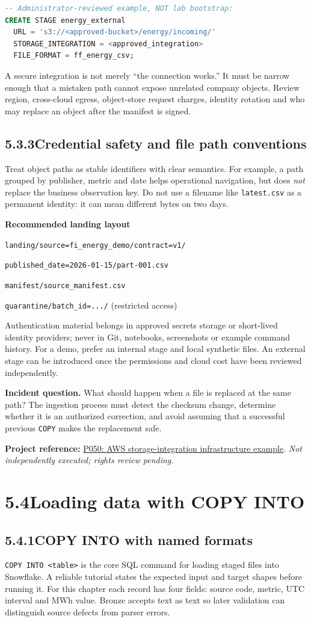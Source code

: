 \documentclass[11pt,twoside]{article}
\newcommand{\topic}[2]{\subsection*{#1\quad #2}}
\newcommand{\repo}[2]{\par\begingroup\fontsize{8.0}{9.6}\selectfont\sffamily\color{inkgray}\textbf{Project reference:} \href{#2}{#1}. \textit{Not independently executed; rights review pending.}\par\endgroup}
\begin{document}
\begin{lstlisting}[language=SQL,caption={External-stage shape; placeholders are not runnable credentials.}]
-- Administrator-reviewed example, NOT lab bootstrap:
CREATE STAGE energy_external
  URL = 's3://<approved-bucket>/energy/incoming/'
  STORAGE_INTEGRATION = <approved_integration>
  FILE_FORMAT = ff_energy_csv;
\end{lstlisting}
A secure integration is not merely ``the connection works.'' It must be narrow enough that a mistaken path cannot expose unrelated company objects. Review region, cross-cloud egress, object-store request charges, identity rotation and who may replace an object after the manifest is signed.

\topic{5.3.3}{Credential safety and file path conventions}
Treat object paths as stable identifiers with clear semantics. For example, a path grouped by publisher, metric and date helps operational navigation, but does \emph{not} replace the business observation key. Do not use a filename like \texttt{latest.csv} as a permanent identity: it can mean different bytes on two days.

\begin{whitebox}\textbf{Recommended landing layout}\par
\texttt{landing/source=fi\_energy\_demo/contract=v1/}\par
\texttt{\quad published\_date=2026-01-15/part-001.csv}\par
\texttt{manifest/source\_manifest.csv}\par
\texttt{quarantine/batch\_id=.../} (restricted access)\end{whitebox}
Authentication material belongs in approved secrets storage or short-lived identity providers; never in Git, notebooks, screenshots or example command history. For a demo, prefer an internal stage and local synthetic files. An external stage can be introduced once the permissions and cloud cost have been reviewed independently.

\textbf{Incident question.} What should happen when a file is replaced at the same path? The ingestion process must detect the checksum change, determine whether it is an authorized correction, and avoid assuming that a successful previous \texttt{COPY} makes the replacement safe.
\repo{P050: AWS storage-integration infrastructure example}{https://github.com/Snowflake-Labs/terraform-snowflake-storage-integration-aws}
\newpage
\section*{5.4\quad Loading data with COPY INTO}
\topic{5.4.1}{COPY INTO with named formats}
\texttt{COPY INTO <table>} is the core SQL command for loading staged files into Snowflake. A reliable tutorial states the expected input and target shapes before running it. For this chapter each record has four fields: source code, metric, UTC interval and MWh value. Bronze accepts text as text so later validation can distinguish source defects from parser errors.
\end{document}
